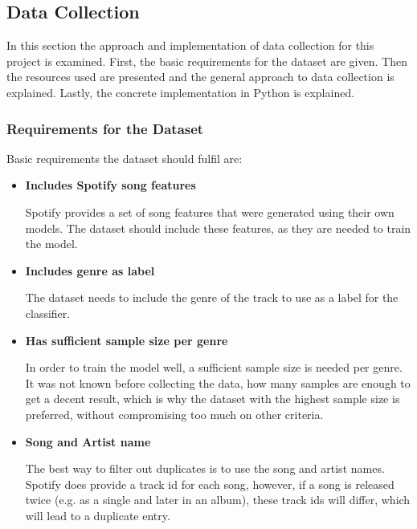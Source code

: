 \subsection{Data Collection}
\label{sec:Data Collection}

In this section the approach and implementation of data collection for this project is 
examined. First, the basic requirements for the dataset are given.
Then the resources used are presented and the general approach to data collection
is explained.
Lastly, the concrete implementation in Python is explained.

\subsubsection{Requirements for the Dataset}

Basic requirements the dataset should fulfil are:

\begin{itemize}
    \item \textbf{Includes Spotify song features}

    Spotify provides a set of song features that were generated using their own models.
    The dataset should include these features, as they are needed to train the model.
    
    \item \textbf{Includes genre as label}

    The dataset needs to include the genre of the track to use as a label for the classifier.

    \item \textbf{Has sufficient sample size per genre}

    In order to train the model well, a sufficient sample size is needed per genre.
    It was not known before collecting the data, how many samples are enough to get a decent result,
    which is why the dataset with the highest sample size is preferred, without compromising too
    much on other criteria. 

    \item \textbf{Song and Artist name}

    The best way to filter out duplicates is to use the song and artist names.
    Spotify does provide a track id for each song, however, if a song is released twice
    (e.g. as a single and later in an album), these track ids will differ, which will lead
    to a duplicate entry.
\end{itemize}

